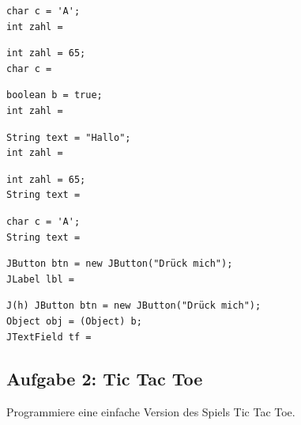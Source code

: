 \begin{compactenum}[a)]
\item 
\begin{lstlisting}
char c = 'A';
int zahl = 
\end{lstlisting}

\item 
\begin{lstlisting}
int zahl = 65;
char c =
\end{lstlisting}

\item 
\begin{lstlisting}
boolean b = true;
int zahl =
\end{lstlisting}

\item 
\begin{lstlisting}
String text = "Hallo";
int zahl =
\end{lstlisting}

\item 
\begin{lstlisting}
int zahl = 65;
String text =
\end{lstlisting}

\item 
\begin{lstlisting}
char c = 'A';
String text =
\end{lstlisting}

\item 
\begin{lstlisting}
JButton btn = new JButton("Drück mich");
JLabel lbl =
\end{lstlisting}

\item 
\begin{lstlisting}
J(h) JButton btn = new JButton("Drück mich");
Object obj = (Object) b;
JTextField tf =
\end{lstlisting}
\end{compactenum}


\subsection{Aufgabe 2: Tic Tac Toe}

Programmiere eine einfache Version des Spiels Tic Tac Toe.

